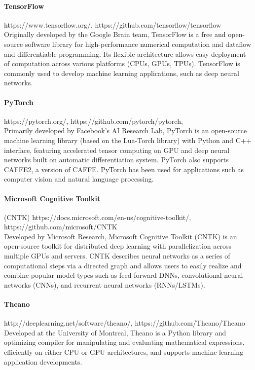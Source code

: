 \paragraph{TensorFlow} https://www.tensorflow.org/, https://github.com/tensorflow/tensorflow \\Originally developed by the Google Brain team, TensorFlow is a free and open-source software library for high-performance numerical computation and dataflow and differentiable programming. Its flexible architecture allows easy deployment of computation across various platforms (CPUs, GPUs, TPUs). TensorFlow is commonly used to develop machine learning applications, such as deep neural networks.

\paragraph{PyTorch} https://pytorch.org/, https://github.com/pytorch/pytorch, \\Primarily developed by Facebook's AI Research Lab, PyTorch is an open-source machine learning library (based on the Lua-Torch library) with Python and C++ interface, featuring accelerated tensor computing on GPU and deep neural networks built on automatic differentiation system. PyTorch also supports CAFFE2, a version of CAFFE. PyTorch has been used for applications such as computer vision and natural language processing. 

\paragraph{Microsoft Cognitive Toolkit} (CNTK) https://docs.microsoft.com/en-us/cognitive-toolkit/, https://github.com/microsoft/CNTK \\Developed by Microsoft Research, Microsoft Cognitive Toolkit (CNTK) is an open-source toolkit for distributed deep learning with parallelization across multiple GPUs and servers. CNTK describes neural networks as a series of computational steps via a directed graph and allows users to easily realize and combine popular model types such as feed-forward DNNs, convolutional neural networks (CNNs), and recurrent neural networks (RNNs/LSTMs).

\paragraph{Theano} http://deeplearning.net/software/theano/, https://github.com/Theano/Theano \\Developed at the University of Montreal, Theano is a Python library and optimizing compiler for manipulating and evaluating mathematical expressions, efficiently on either CPU or GPU architectures, and supports machine learning application developments. 

